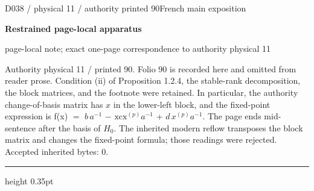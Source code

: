 \documentclass[9pt]{article}
\newcommand{\CanonText}[1]{\par{\fontsize{8.0}{9.35}\selectfont\RaggedRight #1\par}\vspace{2.2pt}}
\newcommand{\LayerTitle}{Restrained page-local apparatus}
\begin{document}
\noindent\begin{minipage}[t][\dimexpr\textheight-5pt\relax][t]{\textwidth}
{\sffamily\fontsize{7.3}{8.2}\selectfont\color{Quiet} D038 / physical 11 / authority printed 90\hfill French main exposition}
\par{}\vspace{4.5pt}
{\sffamily\fontsize{10.4}{11.6}\selectfont\bfseries\color{Accent} \LayerTitle}
\par{\sffamily\fontsize{6.7}{7.7}\selectfont\color{Quiet} page-local note; exact one-page correspondence to authority physical 11}
\vspace{5pt}
\CanonText{Authority physical 11 / printed 90. Folio 90 is recorded here and omitted from reader prose. Condition (ii) of Proposition 1.2.4, the stable-rank decomposition, the block matrices, and the footnote were retained. In particular, the authority change-of-basis matrix has \(x\) in the lower-left block, and the fixed-point expression is f(x) \(=\) \(b\,a^{-1}\) \(-\) \(\text{xcx}^{(p)}a^{-1}\) + \(d\,x^{(p)}a^{-1}\). The page ends mid-sentence after the basis of \(H_{0}\). The inherited modern reflow transposes the block matrix and changes the fixed-point formula; those readings were rejected. Accepted inherited bytes: 0.}
\vfill
{\color{Accent}\hrule height 0.35pt}\vspace{3pt}
\end{minipage}
\newpage
\end{document}

